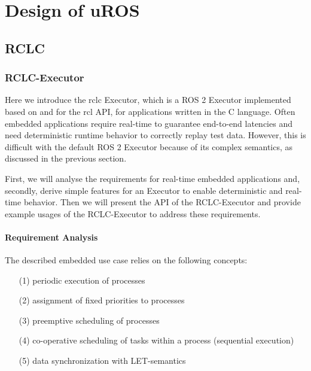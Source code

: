 \chapter{Design of uROS}
\section{RCLC}
\subsection{RCLC-Executor}
Here we introduce the rclc Executor, which is a ROS 2 Executor implemented based on and for the rcl API, for applications written in the C language. Often embedded applications require real-time to guarantee end-to-end latencies and need deterministic runtime behavior to correctly replay test data. However, this is difficult with the default ROS 2 Executor because of its complex semantics, as discussed in the previous section.

First, we will analyse the requirements for real-time embedded applications and, secondly, derive simple features for an Executor to enable deterministic and real-time behavior. Then we will present the API of the RCLC-Executor and provide example usages of the RCLC-Executor to address these requirements.

\subsubsection{Requirement Analysis}

The described embedded use case relies on the following concepts:
\begin{itemize}
    \item [(1)] periodic execution of processes
    \item [(2)] assignment of fixed priorities to processes
    \item [(3)] preemptive scheduling of processes
    \item [(4)] co-operative scheduling of tasks within a process (sequential execution)
    \item [(5)] data synchronization with LET-semantics
\end{itemize}

